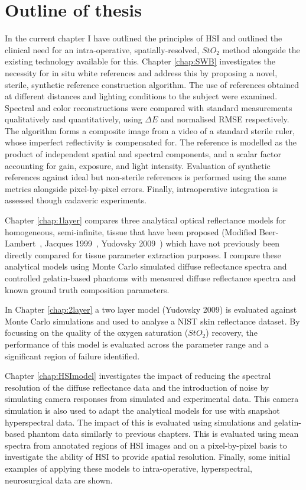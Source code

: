\section{Outline of thesis}\label{sec:thesisoutline}
In the current chapter I have outlined the principles of HSI and outlined the clinical need for an intra-operative, spatially-resolved, $StO_2$ method alongside the existing technology available for this. 
Chapter \ref{chap:SWB} investigates the necessity for in situ white references and address this by proposing a novel, sterile, synthetic reference construction algorithm. The use of references obtained at different distances and lighting conditions to the subject were examined. Spectral and color reconstructions were compared with standard measurements qualitatively and quantitatively, using $\Delta E$ and normalised RMSE respectively. The algorithm forms a composite image from a video of a standard sterile ruler, whose imperfect reflectivity is compensated for. The reference is modelled as the product of independent spatial and spectral components, and a scalar factor accounting for gain, exposure, and light intensity. Evaluation of synthetic references against ideal but non-sterile references is performed using the same metrics alongside pixel-by-pixel errors. Finally, intraoperative integration is assessed though cadaveric experiments.

Chapter \ref{chap:1layer} compares three analytical optical reflectance models for homogeneous, semi-infinite, tissue that have been proposed (Modified Beer-Lambert~\cite{Clancy2015}, Jacques 1999~\cite{Jacques1999}, Yudovsky 2009~\cite{Yudovsky2009}) which have not previously been directly compared for tissue parameter extraction purposes. I compare these analytical models using Monte Carlo simulated diffuse reflectance spectra and controlled gelatin-based phantoms with measured diffuse reflectance spectra and known ground truth composition parameters. 

In Chapter \ref{chap:2layer} a two layer model (Yudovsky 2009) is evaluated against Monte Carlo simulations and used to analyse a NIST skin reflectance dataset. By focussing on the quality of the oxygen saturation ($StO_2$) recovery, the performance of this model is evaluated across the parameter range and a significant region of failure identified. 

Chapter \ref{chap:HSImodel} investigates the impact of reducing the spectral resolution of the diffuse reflectance data and the introduction of noise by simulating camera responses from simulated and experimental data. This camera simulation is also used to adapt the analytical models for use with snapshot hyperspectral data. The impact of this is evaluated using simulations and gelatin-based phantom data similarly to previous chapters. This is evaluated using mean spectra from annotated regions of HSI images and on a pixel-by-pixel basis to investigate the ability of HSI to provide spatial resolution. Finally, some initial examples of applying these models to intra-operative, hyperspectral, neurosurgical data are shown. 